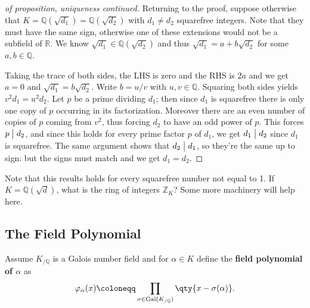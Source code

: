 \begin{proof}[of proposition, uniqueness continued]

Returning to the proof, suppose otherwise that
\(K = {\mathbb{Q}}(\sqrt{d_1} ) = {\mathbb{Q}}( \sqrt{d_2} )\) with
\(d_1\neq d_2\) squarefree integers. Note that they must have the same
sign, otherwise one of these extensions would not be a subfield of
\({\mathbb{R}}\). We know \(\sqrt{d_1} \in {\mathbb{Q}}( \sqrt{d_2} )\)
and thus \(\sqrt{d_1} = a + b \sqrt{d_2}\) for some
\(a, b\in {\mathbb{Q}}\).

\hfill\break

Taking the trace of both sides, the LHS is zero and the RHS is \(2a\)
and we get \(a=0\) and \(\sqrt{d_1} = b \sqrt{d_2}\). Write \(b = u/v\)
with \(u,v\in {\mathbb{Q}}\). Squaring both sides yields
\(v^2 d_1 = u^2 d_2\). Let \(p\) be a prime dividing \(d_1\); then since
\(d_1\) is squarefree there is only one copy of \(p\) occurring in its
factorization. Moreover there are an even number of copies of \(p\)
coming from \(v^2\), thus forcing \(d_2\) to have an odd power of \(p\).
This forces \(p\bigm|d_2\), and since this holds for every prime factor
\(p\) of \(d_1\), we get \(d_1 \bigm|d_2\) since \(d_1\) is squarefree.
The same argument shows that \(d_2 \bigm|d_1\), so they're the same up
to sign: but the signs must match and we get \(d_1 = d_2\).

\end{proof}

\begin{remark}

Note that this results holds for every squarefree number not equal to 1.
If \(K = {\mathbb{Q}}( \sqrt{d} )\), what is the ring of integers
\({\mathbb{Z}}_K\)? Some more machinery will help here.

\end{remark}

\hypertarget{the-field-polynomial}{%
\subsection{The Field Polynomial}\label{the-field-polynomial}}

\begin{definition}

Assume \(K_{/{\mathbb{Q}}}\) is a Galois number field and for
\(\alpha\in K\) define the \textbf{field polynomial of \(\alpha\)} as
\begin{align*}
\varphi_{\alpha}(x) \coloneqq\prod_{ \sigma\in \operatorname{Gal}(K_{/{\mathbb{Q}}})} \qty{ x - \sigma(\alpha)}
.\end{align*}

\end{definition}

